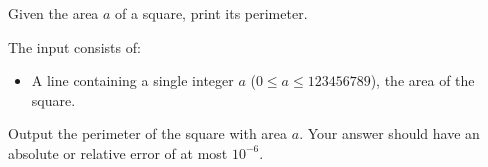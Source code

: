 \problemname{\problemyamlname}


\newcommand{\maxa}{123456789}

Given the area $a$ of a square, print its perimeter.

\begin{Input}
	The input consists of:
	\begin{itemize}
		\item A line containing a single integer $a$ ($0\leq a\leq \maxa$), the area of the square.
	\end{itemize}
\end{Input}

\begin{Output}
	Output the perimeter of the square with area $a$.
	Your answer should have an absolute or relative error of at most $10^{-6}$.
\end{Output}

